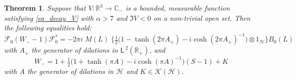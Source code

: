 \documentclass{article}
\def\C{\mathbb C}
\def\F{\mathscr F}
\def\H{\mathcal H}
\def\K{\mathscr K}
\def\R{\mathbb R}
\def\ltwo{\mathsf{L}^{\:\!\!2}}
\newtheorem{Theorem}{Theorem}[section]
\begin{document}
\begin{Theorem}\label{thm_formula}
Suppose that $V:\R^3\to \C_-$ is a bounded, measurable function satisfying \eqref{eq_decay_V} with $\alpha>7$ and $\Im V<0$ on a non-trivial open set.
Then the following 
equalities hold:
\begin{equation}\label{eq_thm_1}
\F_0 (W_--1)\F_0^* = -2\pi i\;\!M(L)\;\!\big\{\tfrac12\big(1-\tanh(2\pi A_+)-i\cosh(2\pi A_+)^{-1}\big)\otimes1_{\H}\big\}B_0(L)
\end{equation}
with $A_+$ the generator of dilations in $\ltwo(\R_+)$, and  
\begin{equation*}
W_-=1+\tfrac12\big(1+\tanh(\pi A)-i\cosh(\pi A)^{-1}\big)(S-1)+K
\end{equation*}
with $A$ the generator of dilations in $\H$ and $K\in \K(\H)$.
\end{Theorem}
\end{document}
